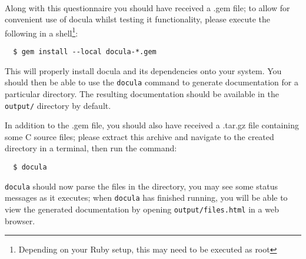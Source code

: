 \begin{Form}
  \medskip
  \TextField[name=additionalcomment,width=\longline,
    borderwidth=0,backgroundcolor={.85 .85 .85}]{}\\




  Along with this questionnaire you should have received a .gem file; to allow
  for convenient use of docula whilst testing it functionality, please execute
  the following in a shell\footnote{Depending on your Ruby setup, this may need
  to be executed as root}:
  \begin{verbatim}
  $ gem install --local docula-*.gem
  \end{verbatim}
  This will properly install docula and its dependencies onto your system. You
  should then be able to use the \verb|docula| command to generate documentation
  for a particular directory. The resulting documentation should be available in
  the \verb|output/| directory by default.

  In addition to the .gem file, you should also have received a .tar.gz file
  containing some C source files; please extract this archive and navigate to the
  created directory in a terminal, then run the command:
  \begin{verbatim}
  $ docula
  \end{verbatim}
  \verb|docula| should now parse the files in the directory, you may see some
  status messages as it executes; when \verb|docula| has finished running, you
  will be able to view the generated documentation by opening
  \verb|output/files.html| in a web browser.\\




\end{Form}
